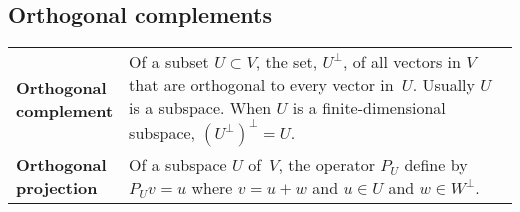 \documentclass[10pt, a4paper, landscape]{article}
\newcommand{\defn}[1]{\textbf{#1}}
\newlength{\termheaderwd}
\begin{document}
\begin{multicols*}{3}

\section*{Orthogonal complements}
\begin{tabularx}{\columnwidth}{@{}l>{\raggedright\arraybackslash}X@{}}
  \toprule
  \settowidth{\termheaderwd}{Orthogonal}%
  \parbox[t]{\termheaderwd}{\defn{Orthogonal\\ complement}}

  & Of a subset $U\subset V$, the set, $U^\perp$, of all vectors in $V$ that are orthogonal to every vector in~$U$. Usually $U$ is a subspace. When $U$ is a finite-dimensional subspace,  ${(U^\perp)}^\perp = U$.\\

  \parbox[t]{\termheaderwd}{\defn{Orthogonal\\ projection}}
  & Of a subspace $U$ of~$V$, the operator $P_U$ define by $P_U v = u$ where $v = u + w$ and $u\in U$ and $w\in W^\perp$. \\ 

  

\end{tabularx}

\end{multicols*}
\end{document}
